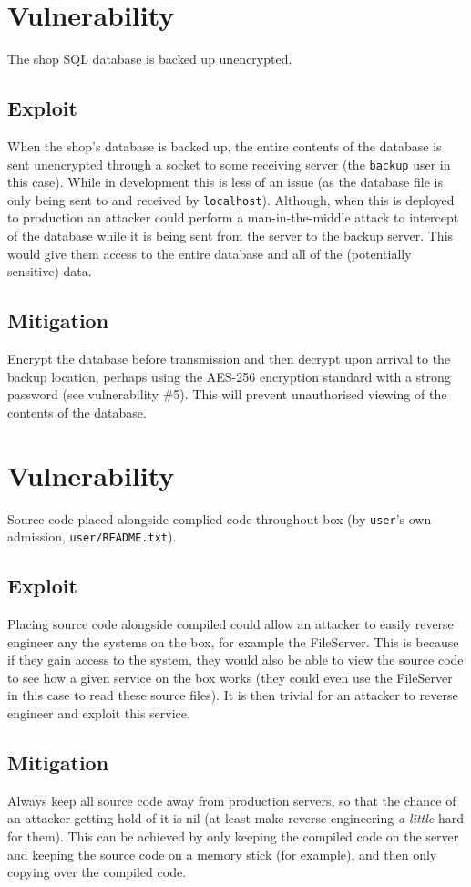 \documentclass[11pt]{article}
\begin{document}
\section{Vulnerability}

The shop SQL database is backed up unencrypted.

\subsection{Exploit}

When the shop's database is backed up, the entire contents of the database is sent unencrypted through a socket to some receiving server (the \texttt{backup} user in this case). While in development this is less of an issue (as the database file is only being sent to and received by \texttt{localhost}). Although, when this is deployed to production an attacker could perform a man-in-the-middle attack to intercept of the database while it is being sent from the server to the backup server. This would give them access to the entire database and all of the (potentially sensitive) data.

\subsection{Mitigation}

Encrypt the database before transmission and then decrypt upon arrival to the backup location, perhaps using the AES-256 encryption standard with a strong password (see vulnerability \#5). This will prevent unauthorised viewing of the contents of the database.

\section{Vulnerability}

Source code placed alongside complied code throughout box (by \texttt{user}'s own admission, \texttt{user/README.txt}).

\subsection{Exploit}

Placing source code alongside compiled could allow an attacker to easily reverse engineer any the systems on the box, for example the FileServer. This is because if they gain access to the system, they would also be able to view the source code to see how a given service on the box works (they could even use the FileServer in this case to read these source files). It is then trivial for an attacker to reverse engineer and exploit this service.

\subsection{Mitigation}

Always keep all source code away from production servers, so that the chance of an attacker getting hold of it is nil (at least make reverse engineering \textit{a little} hard for them). This can be achieved by only keeping the compiled code on the server and keeping the source code on a memory stick (for example), and then only copying over the compiled code.
\end{document}
